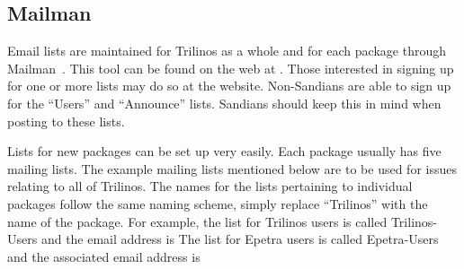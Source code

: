 \documentclass[12pt,relax]{TrilinosDevGuide}
\begin{document}
\subsection{Mailman}
\label{subsect:MailMan}
Email lists are maintained for Trilinos as a whole and for each package 
through Mailman~\cite{Mailman}.  This tool can be found on the web at 
\newline
{}.  
Those interested in signing 
up for one or more lists may do so at the website.  Non-Sandians are able to 
sign up for the ``Users'' and ``Announce'' lists.  Sandians should keep this 
in mind when posting to these lists.

Lists for new packages can be set up very easily.  Each package usually has 
five mailing lists.  The example mailing lists mentioned below are to be used 
for issues relating to all of Trilinos.  The names for the lists pertaining to 
individual packages follow the same naming scheme, simply replace ``Trilinos'' 
with the name of the package.  For example, the list for Trilinos users is 
called Trilinos-Users and the email address is 
  The list 
for Epetra users is called Epetra-Users and the associated email address is 

\end{document}
